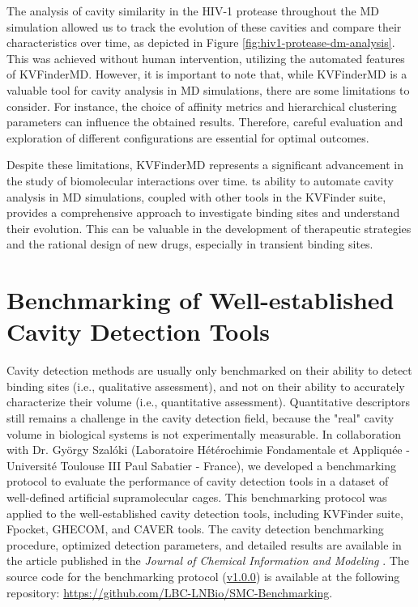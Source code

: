 \documentclass[Ingles]{phdthesis}
\def\ie{i.e.\onedot}
\begin{document}
The analysis of cavity similarity in the \acs{HIV-1} protease throughout the \acs{MD} simulation allowed us to track the evolution of these cavities and compare their characteristics over time, as depicted in Figure \ref{fig:hiv1-protease-dm-analysis}. This was achieved without human intervention, utilizing the automated features of KVFinderMD. However, it is important to note that, while KVFinderMD is a valuable tool for cavity analysis in \acs{MD} simulations, there are some limitations to consider. For instance, the choice of affinity metrics and hierarchical clustering parameters can influence the obtained results. Therefore, careful evaluation and exploration of different configurations are essential for optimal outcomes.

Despite these limitations, KVFinderMD represents a significant advancement in the study of biomolecular interactions over time. ts ability to automate cavity analysis in \acs{MD} simulations, coupled with other tools in the KVFinder suite, provides a comprehensive approach to investigate binding sites and understand their evolution. This can be valuable in the development of therapeutic strategies and the rational design of new drugs, especially in transient binding sites.

\section{Benchmarking of Well-established Cavity Detection Tools}

Cavity detection methods are usually only benchmarked on their ability to detect binding sites (\ie, qualitative assessment), and not on their ability to accurately characterize their volume (\ie, quantitative assessment). Quantitative descriptors still remains a challenge in the cavity detection field, because the "real" cavity volume in biological systems is not experimentally measurable. In collaboration with Dr. György Szalóki (Laboratoire Hétérochimie Fondamentale et Appliquée - Université Toulouse III Paul Sabatier - France), we developed a benchmarking protocol to evaluate the performance of cavity detection tools in a dataset of well-defined artificial supramolecular cages. This benchmarking protocol was applied to the well-established cavity detection tools, including KVFinder suite, Fpocket, GHECOM, and CAVER tools. The cavity detection benchmarking procedure, optimized detection parameters, and detailed results are available in the article published in the \textit{Journal of Chemical Information and Modeling} \cite{guerra2023B}. The source code for the benchmarking protocol (\href{https://github.com/LBC-LNBio/SMC-Benchmarking/releases/tag/v1.0.0}{v1.0.0}) is available at the following repository: \url{https://github.com/LBC-LNBio/SMC-Benchmarking}.
\end{document}
